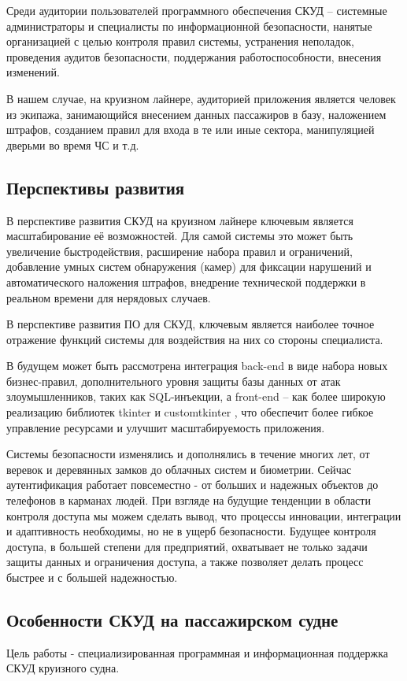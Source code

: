 Среди аудитории пользователей программного обеспечения СКУД -- системные администраторы и специалисты по информационной безопасности, нанятые организацией с целью контроля правил системы, устранения неполадок, проведения аудитов безопасности, поддержания работоспособности, внесения изменений.

В нашем случае, на круизном лайнере, аудиторией приложения является человек из экипажа, занимающийся внесением данных пассажиров в базу, наложением штрафов, созданием правил для входа в те или иные сектора, манипуляцией дверьми во время ЧС и т.д.

\subsection{Перспективы развития}
В перспективе развития СКУД на круизном лайнере ключевым является масштабирование её возможностей. Для самой системы это может быть увеличение быстродействия, расширение набора правил и ограничений, добавление умных систем обнаружения (камер) для фиксации нарушений и автоматического наложения штрафов, внедрение технической поддержки в реальном времени для нерядовых случаев.

В перспективе развития ПО для СКУД, ключевым является наиболее точное отражение функций системы для воздействия на них со стороны специалиста.

В будущем может быть рассмотрена интеграция back-end в виде набора новых бизнес-правил, дополнительного уровня защиты базы данных от атак злоумышленников, таких как SQL-инъекции, а front-end – как более широкую реализацию библиотек \textquotedbl tkinter \textquotedbl и \textquotedbl customtkinter \textquotedbl, что обеспечит более гибкое управление ресурсами и улучшит масштабируемость приложения.

Системы безопасности изменялись и дополнялись в течение многих лет, от веревок и деревянных замков до облачных систем и биометрии. Сейчас аутентификация работает повсеместно - от больших и надежных объектов до телефонов в карманах людей. При взгляде на будущие тенденции в области контроля доступа мы можем сделать вывод, что процессы инновации, интеграции и адаптивность необходимы, но не в ущерб безопасности. Будущее контроля доступа, в большей степени для предприятий, охватывает не только задачи защиты данных и ограничения доступа, а также позволяет делать процесс быстрее и с большей надежностью.   

\subsection{Особенности СКУД на пассажирском судне}
Цель работы - специализированная программная и информационная поддержка СКУД круизного судна.

